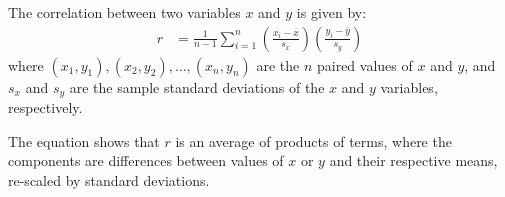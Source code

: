 \begin{termBox}{%
		The correlation between two variables $x$ and $y$ is given by:
		\begin{align*}
          r &=  \frac{1}{n-1}\sum^{n}_{i=1}
          \left(\frac{x_{i}-\overline{x}}
          {s_{x}}\right)\left(\frac{y_{i}-\overline{y}}{s_{y}}\right)
 		\label{correlationEquation}
 		\end{align*}
        where $(x_1,y_1), (x_2,y_2), \ldots, (x_n, y_n)$ are the $n$ paired values of $x$ and $y$, and $s_x$ and $s_y$ are the sample standard deviations of the $x$ and $y$
        variables, respectively.}
\end{termBox}

The equation shows that $r$ is an average of products of terms, where the components are differences between values of $x$ or $y$ and their respective means, re-scaled by standard deviations. 

